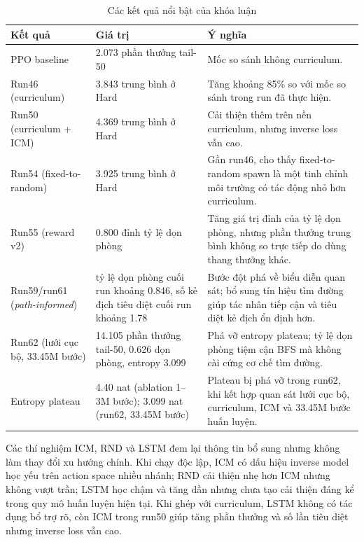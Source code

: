 \begin{table}[H]
    \centering
    \small
    \caption{Các kết quả nổi bật của khóa luận}
    \label{tab:conclusion_best_results}
    \begin{tabular}{|p{4.0cm}|p{3.5cm}|p{6.5cm}|}
        \hline
        \textbf{Kết quả} & \textbf{Giá trị} & \textbf{Ý nghĩa} \\
        \hline
        PPO baseline & 2.073 phần thưởng tail-50 & Mốc so sánh không curriculum. \\
        \hline
        Run46 (curriculum) & 3.843 trung bình ở Hard & Tăng khoảng 85\% so với mốc so sánh trong run đã thực hiện. \\
        \hline
        Run50 (curriculum + ICM) & 4.369 trung bình ở Hard & Cải thiện thêm trên nền curriculum, nhưng inverse loss vẫn cao. \\
        \hline
        Run54 (fixed-to-random) & 3.925 trung bình ở Hard & Gần run46, cho thấy fixed-to-random spawn là một tinh chỉnh môi trường có tác động nhỏ hơn curriculum. \\
        \hline
        Run55 (reward v2) & 0.800 đỉnh tỷ lệ dọn phòng & Tăng giá trị đỉnh của tỷ lệ dọn phòng, nhưng phần thưởng trung bình không so trực tiếp do dùng thang thưởng khác. \\
        \hline
        Run59/run61 (\emph{path-informed}) & tỷ lệ dọn phòng cuối run khoảng 0.846, số kẻ địch tiêu diệt cuối run khoảng 1.78 & Bước đột phá về biểu diễn quan sát; bổ sung tín hiệu tìm đường giúp tác nhân tiếp cận và tiêu diệt kẻ địch ổn định hơn. \\
        \hline
        Run62 (lưới cục bộ, 33.45M bước) & 14.105 phần thưởng tail-50, 0.626 dọn phòng, entropy 3.099 & Phá vỡ entropy plateau; tỷ lệ dọn phòng tiệm cận BFS mà không cài cứng cơ chế tìm đường. \\
        \hline
        Entropy plateau & 4.40 nat (ablation 1--3M bước); 3.099 nat (run62, 33.45M bước) & Plateau bị phá vỡ trong run62, khi kết hợp quan sát lưới cục bộ, curriculum, ICM và 33.45M bước huấn luyện. \\
        \hline
    \end{tabular}
\end{table}

Các thí nghiệm ICM, RND và LSTM đem lại thông tin bổ sung nhưng không làm thay đổi xu hướng chính. Khi chạy độc lập, ICM có dấu hiệu inverse model học yếu trên action space nhiều nhánh; RND cải thiện nhẹ hơn ICM nhưng không vượt trần; LSTM học chậm và tăng dần nhưng chưa tạo cải thiện đáng kể trong quy mô huấn luyện hiện tại. Khi ghép với curriculum, LSTM không có tác dụng bổ trợ rõ, còn ICM trong run50 giúp tăng phần thưởng và số lần tiêu diệt nhưng inverse loss vẫn cao.

